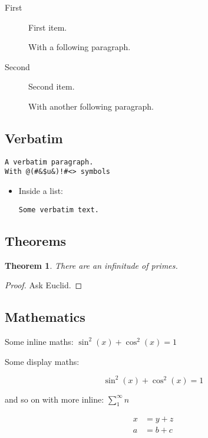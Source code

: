 \documentclass[
  text,
  xhtml,
  itex
]{internet}
\newtheorem{theorem}{Theorem}
\begin{document}
\begin{description}
\item[First] First item.

With a following paragraph.

\item[Second] Second item.

With another following paragraph.
\end{description}


\subsection{Verbatim}

\begin{verbatim}
A verbatim paragraph.
With @(#&$u&)!#<> symbols
\end{verbatim}

\begin{itemize}
\item Inside a list:

\begin{verbatim}
Some verbatim text.
\end{verbatim}

\end{itemize}

\subsection{Theorems}

\begin{theorem}
There are an infinitude of primes.
\end{theorem}

\begin{proof}
Ask Euclid.
\end{proof}

\subsection{Mathematics}

Some inline maths: \(\sin^2(x) + \cos^2(x) = 1\)

Some display maths:

\[
  \sin^2(x) + \cos^2(x) = 1
\]

and so on with more inline: \(\sum_1^\infty n\)

\begin{align*}
x &= y + z \\
a &= b + c
\end{align*}
\end{document}
